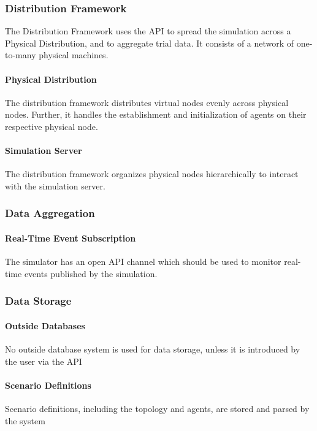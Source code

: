 \documentclass[titlepage]{article}
\begin{document}
\subsubsection{Distribution Framework}
	The Distribution Framework uses the API to spread the simulation across a Physical Distribution, and to aggregate trial data. It consists of a network of one-to-many physical machines.
	\paragraph{Physical Distribution} The distribution framework distributes virtual nodes evenly across physical nodes. Further, it handles the establishment and initialization of agents on their respective physical node.
	\paragraph{Simulation Server} The distribution framework organizes physical nodes hierarchically to interact with the simulation server.

\subsubsection{Data Aggregation}
    \paragraph{Real-Time Event Subscription} The simulator has an open API channel which should be used to monitor real-time events published by the simulation.


\subsubsection{Data Storage%
  \label{data-storage}%
}
    \paragraph{Outside Databases} No outside database system is used for data storage, unless it is introduced by the user via the API
    \paragraph{Scenario Definitions} Scenario definitions, including the topology and agents, are stored and parsed by the system
\end{document}
